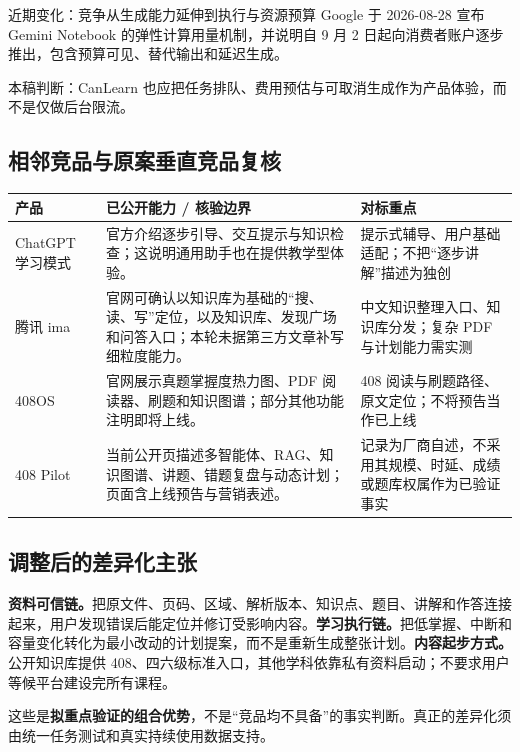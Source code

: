 \documentclass[UTF8,a4paper,11pt,fontset=none]{ctexart}
\newcommand{\cth}[1]{\textbf{\sffamily #1}}
\newcommand{\cont}[1]{\clearpage\noindent{\small\sffamily\color{Muted}#1}\par\vspace{3pt}}
\newenvironment{tbl}{\par\vspace{3pt}\small\noindent\ignorespaces}{\unskip\par\vspace{5pt}}
\begin{document}
\begin{insight}{近期变化：竞争从生成能力延伸到执行与资源预算}
Google 于 2026-08-28 宣布 Gemini Notebook 的弹性计算用量机制，并说明自 9 月 2 日起向消费者账户逐步推出，包含预算可见、替代输出和延迟生成。\cite{google_limits} \par
本稿判断：CanLearn 也应把任务排队、费用预估与可取消生成作为产品体验，而不是仅做后台限流。
\end{insight}

\cont{3 / 竞争格局与最新研究（续）}
\subsection{相邻竞品与原案垂直竞品复核}
\begin{tbl}
\begin{tabularx}{\linewidth}{@{}L{25mm}YY@{}}
\toprule
\cth{产品}&\cth{已公开能力 / 核验边界}&\cth{对标重点}\\\midrule
ChatGPT 学习模式&官方介绍逐步引导、交互提示与知识检查；这说明通用助手也在提供教学型体验。\cite{chatgpt}&提示式辅导、用户基础适配；不把“逐步讲解”描述为独创\\
腾讯 ima&官网可确认以知识库为基础的“搜、读、写”定位，以及知识库、发现广场和问答入口；本轮未据第三方文章补写细粒度能力。\cite{ima}&中文知识整理入口、知识库分发；复杂 PDF 与计划能力需实测\\
408OS&官网展示真题掌握度热力图、PDF 阅读器、刷题和知识图谱；部分其他功能注明即将上线。\cite{os408}&408 阅读与刷题路径、原文定位；不将预告当作已上线\\
408 Pilot&当前公开页描述多智能体、RAG、知识图谱、讲题、错题复盘与动态计划；页面含上线预告与营销表述。\cite{pilot408}&记录为厂商自述，不采用其规模、时延、成绩或题库权属作为已验证事实\\
\bottomrule
\end{tabularx}
\end{tbl}

\subsection{调整后的差异化主张}
\textbf{资料可信链。}把原文件、页码、区域、解析版本、知识点、题目、讲解和作答连接起来，用户发现错误后能定位并修订受影响内容。\textbf{学习执行链。}把低掌握、中断和容量变化转化为最小改动的计划提案，而不是重新生成整张计划。\textbf{内容起步方式。}公开知识库提供 408、四六级标准入口，其他学科依靠私有资料启动；不要求用户等候平台建设完所有课程。

这些是\textbf{拟重点验证的组合优势}，不是“竞品均不具备”的事实判断。真正的差异化须由统一任务测试和真实持续使用数据支持。
\end{document}
